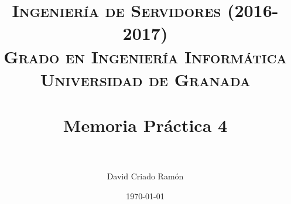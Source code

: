 



\title{	
\normalfont \normalsize 
\textsc{\textbf{Ingeniería de Servidores (2016-2017)} \\ Grado en Ingeniería Informática \\ Universidad de Granada} \\ [25pt] %
\horrule{0.5pt} \\[0.4cm] %
\huge Memoria Práctica 4 \\ %
\horrule{2pt} \\[0.5cm] %
}

\author{David Criado Ramón} %

\date{\normalsize\today} %








\maketitle %

\newpage %

\tableofcontents %

\listoffigures

\listoftables

\newpage
